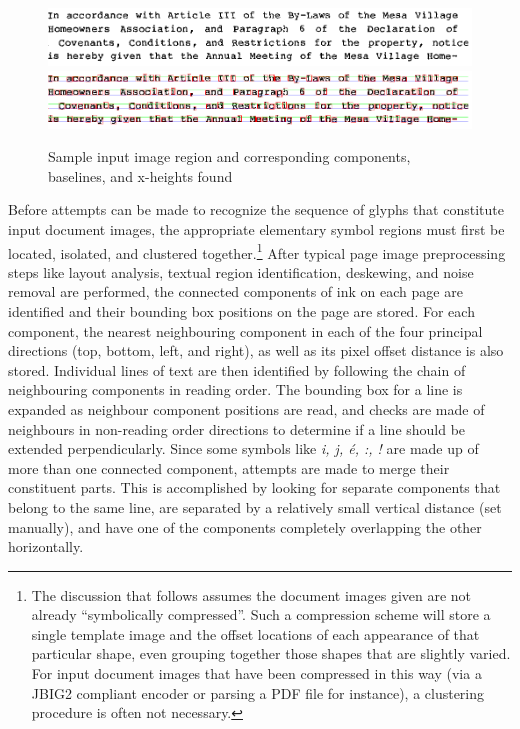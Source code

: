 \documentclass[times, 10pt,twocolumn]{article}
\begin{document}
\begin{figure}[ht]
  \centering
  \includegraphics[scale=1]{figures/input_lines}
  \includegraphics[scale=1]{figures/line_comps}
  \caption{Sample input image region and corresponding components, baselines,
           and x-heights found}
  \label{inimg_fig}
\end{figure}


Before attempts can be made to recognize the sequence of glyphs that 
constitute input document images, the appropriate elementary symbol regions 
must first be located, isolated, and clustered together.\footnote{The
discussion that follows assumes the document images given are not
already ``symbolically compressed''. Such a compression scheme will
store a single template image and the offset locations of each
appearance of that particular shape, even grouping together
those shapes that are slightly varied.  For input document images that
have been compressed in this way (via a JBIG2 compliant encoder 
or parsing a PDF file for instance), a clustering procedure is often not necessary.}
After typical page image preprocessing steps like layout analysis, textual
region identification, deskewing, and noise removal are performed, the
connected components of ink on each page are identified and their bounding box
positions on the page are stored.  For each component, the nearest neighbouring
component in each of the four principal directions (top, bottom, left, and
right), as well as its pixel offset distance is also stored.  Individual lines
of text are then identified by following the chain of neighbouring components in
reading order.  The bounding box for a line is expanded as neighbour
component positions are read, and checks are made of neighbours in non-reading
order directions to determine if a line should be extended perpendicularly.
%
Since some symbols like {\em i, j, \'{e}, :, !} are made up of more than one
connected component, attempts are made to merge their constituent parts.  This
is accomplished by looking for separate components that belong to the same
line, are separated by a relatively small vertical distance (set manually), and
have one of the components completely overlapping the other horizontally.
\end{document}

